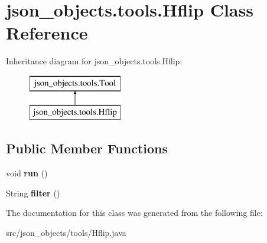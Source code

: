 \hypertarget{classjson__objects_1_1tools_1_1_hflip}{
\section{json\_\-objects.tools.Hflip Class Reference}
\label{classjson__objects_1_1tools_1_1_hflip}
}
Inheritance diagram for json\_\-objects.tools.Hflip:\begin{figure}[H]
\begin{center}
\leavevmode
\includegraphics[height=2.000000cm]{classjson__objects_1_1tools_1_1_hflip}
\end{center}
\end{figure}
\subsection*{Public Member Functions}
\begin{DoxyCompactItemize}
\item 
\hypertarget{classjson__objects_1_1tools_1_1_hflip_a4b8be11bfc38e97dcb268520366e7f4f}{
void {\bfseries run} ()}
\label{classjson__objects_1_1tools_1_1_hflip_a4b8be11bfc38e97dcb268520366e7f4f}

\item 
\hypertarget{classjson__objects_1_1tools_1_1_hflip_ade7f37ad24c38bc785107f600e3b2426}{
String {\bfseries filter} ()}
\label{classjson__objects_1_1tools_1_1_hflip_ade7f37ad24c38bc785107f600e3b2426}

\end{DoxyCompactItemize}


The documentation for this class was generated from the following file:\begin{DoxyCompactItemize}
\item 
src/json\_\-objects/tools/Hflip.java\end{DoxyCompactItemize}
